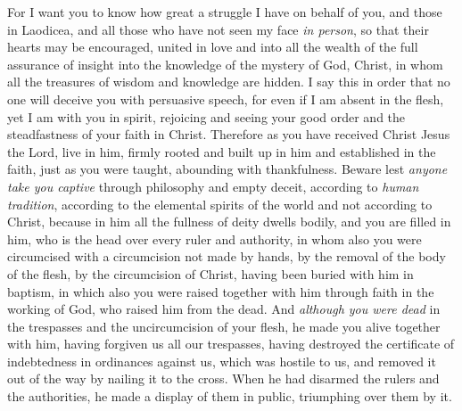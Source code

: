 \begin{biblechapter} %
 For I want you to know how great a struggle I have on behalf of you, and those in Laodicea, and all those who have not seen my face \textit{in person},
\verse so that their hearts may be encouraged, united in love and into all the wealth of the full assurance of insight into the knowledge of the mystery of God, Christ,
\verse in whom all the treasures of wisdom and knowledge are hidden.
\verse I say this in order that no one will deceive you with persuasive speech,
\verse for even if I am absent in the flesh, yet I am with you in spirit, rejoicing and seeing your good order and the steadfastness of your faith in Christ.
 Therefore as you have received Christ Jesus the Lord, live in him,
\verse firmly rooted and built up in him and established in the faith, just as you were taught, abounding with thankfulness.
\verse Beware lest \textit{anyone take you captive} through philosophy and empty deceit, according to \textit{human tradition}, according to the elemental spirits of the world and not according to Christ,
\verse because in him all the fullness of deity dwells bodily,
\verse and you are filled in him, who is the head over every ruler and authority,
\verse in whom also you were circumcised with a circumcision not made by hands, by the removal of the body of the flesh, by the circumcision of Christ,
\verse having been buried with him in baptism, in which also you were raised together with him through faith in the working of God, who raised him from the dead.
\verse And \textit{although you were dead} in the trespasses and the uncircumcision of your flesh, he made you alive together with him, having forgiven us all our trespasses,
\verse having destroyed the certificate of indebtedness in ordinances against us, which was hostile to us, and removed it out of the way by nailing it to the cross.
\verse When he had disarmed the rulers and the authorities, he made a display of them in public, triumphing over them by it.

\end{biblechapter}

